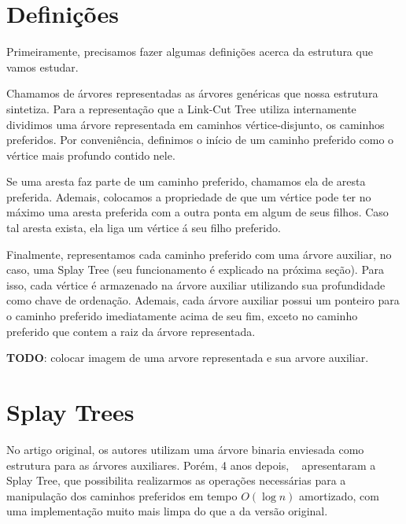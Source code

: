 \section{Definições}
\label{sec:lct-definicoes}

Primeiramente, precisamos fazer algumas definições acerca da estrutura que vamos estudar.

Chamamos de árvores representadas as árvores genéricas que nossa estrutura sintetiza. Para a representação que a Link-Cut Tree utiliza internamente dividimos uma árvore representada em caminhos vértice-disjunto, os caminhos preferidos. Por conveniência, definimos o início de um caminho preferido como o vértice mais profundo contido nele.

Se uma aresta faz parte de um caminho preferido, chamamos ela de aresta preferida. Ademais, colocamos a propriedade de que um vértice pode ter no máximo uma aresta preferida com a outra ponta em algum de seus filhos. Caso tal aresta exista, ela liga um vértice á seu filho preferido.

Finalmente, representamos cada caminho preferido com uma árvore auxiliar, no caso, uma Splay Tree (seu funcionamento é explicado na próxima seção). Para isso, cada vértice é armazenado na árvore auxiliar utilizando sua profundidade como chave de ordenação. Ademais, cada árvore auxiliar possui um ponteiro para o caminho preferido imediatamente acima de seu fim, exceto no caminho preferido que contem a raiz da árvore representada.

\begin{center}
    \textbf{TODO}: colocar imagem de uma arvore representada e sua arvore auxiliar.
\end{center}

\section{Splay Trees}
\label{sec:lct-splay-trees}

No artigo original, os autores utilizam uma árvore binaria enviesada como estrutura para as árvores auxiliares. Porém, 4 anos depois, ~\citet{10.1145/3828.3835} apresentaram a Splay Tree, que possibilita realizarmos as operações necessárias para a manipulação dos caminhos preferidos em tempo $O(\log n)$ amortizado, com uma implementação muito mais limpa do que a da versão original.


